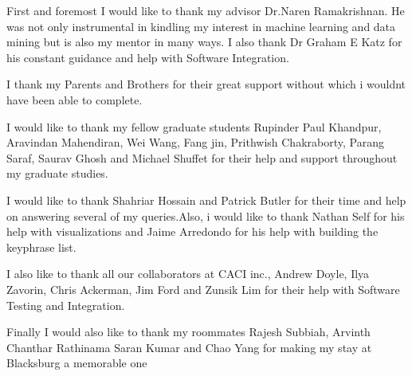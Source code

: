 \vspace*{\fill}
\Large{First and foremost I would like to thank my advisor Dr.Naren Ramakrishnan. He was not only instrumental in kindling my interest in machine learning and data mining but is also my mentor in many ways. I also thank Dr Graham E Katz for his constant guidance and help with Software Integration.

I thank my Parents and Brothers for their great support without which i wouldnt have been able to complete.

I would like to thank my fellow graduate students Rupinder Paul Khandpur, Aravindan Mahendiran, Wei Wang, Fang jin, Prithwish Chakraborty, Parang Saraf, Saurav Ghosh and Michael Shuffet for their help and support throughout my graduate studies. 

I would like to thank Shahriar Hossain and Patrick Butler for their time and help on answering several of my queries.Also, i would like to thank Nathan Self for his help with visualizations and Jaime Arredondo for his help with building the keyphrase list.

I also like to thank all our collaborators at CACI inc., Andrew Doyle, Ilya Zavorin, Chris Ackerman, Jim Ford and Zunsik Lim for their help with Software Testing and Integration.

Finally I would also like to thank my roommates Rajesh Subbiah, Arvinth Chanthar Rathinama Saran Kumar and Chao Yang for making my stay at Blacksburg a memorable one
}
\vspace{\fill}

